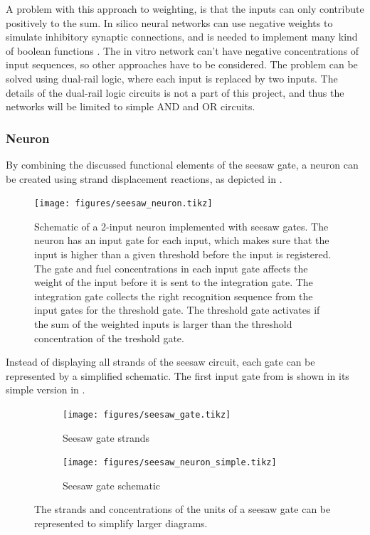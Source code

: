 A problem with this approach to weighting, is that the inputs can only contribute positively to the sum. In silico neural networks can use negative weights to simulate inhibitory synaptic connections, and is needed to implement many kind of boolean functions \cite{ZhaoYanling}. The in vitro network can't have negative concentrations of input sequences, so other approaches have to be considered. The problem can be solved using dual-rail logic, where each input is replaced by two inputs. The details of the dual-rail logic circuits is not a part of this project, and thus the networks will be limited to simple AND and OR circuits.

\subsubsection{Neuron}
By combining the discussed functional elements of the seesaw gate, a neuron can be created using strand displacement reactions, as depicted in .

\begin{figure}[h]
\texttt{[image: figures/seesaw\_neuron.tikz]}
\caption{Schematic of a 2-input neuron implemented with seesaw gates. The neuron has an input gate for each input, which makes sure that the input is higher than a given threshold before the input is registered. The gate and fuel concentrations in each input gate affects the weight of the input before it is sent to the integration gate. The integration gate collects the right recognition sequence from the input gates for the threshold gate. The threshold gate activates if the sum of the weighted inputs is larger than the threshold concentration of the treshold gate.}
\label{seesaw_neuron}
\end{figure}

Instead of displaying all strands of the seesaw circuit, each gate can be represented by a simplified schematic. The first input gate from  is shown in its simple version in .

\begin{figure}[h]
  \begin{subfigure}[t]{.49\textwidth}
    \texttt{[image: figures/seesaw\_gate.tikz]}
    \caption{Seesaw gate strands}
  \end{subfigure}
  \quad
  \begin{subfigure}[t]{.49\textwidth}
    \texttt{[image: figures/seesaw\_neuron\_simple.tikz]}
    \caption{Seesaw gate schematic}
  \end{subfigure}
  \caption{The strands and concentrations of the units of a seesaw gate can be represented to simplify larger diagrams.}
  \label{seesaw_gate_simple}
\end{figure}

